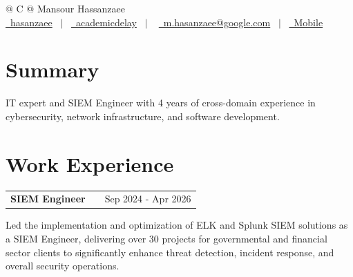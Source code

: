 \documentclass[a4paper,12pt]{article}
\makeatletter
\newenvironment{jobshort}[2]
    {
    \begin{tabularx}{\linewidth}{@{}l X r@{}}
    \textbf{#1} & \hfill &  #2 \\[3.75pt]
    \end{tabularx}
    }
    {
    }
\makeatother
\begin{document}
\pagestyle{empty} 



\begin{tabularx}{\linewidth}{@{} C @{}}
\Huge{Mansour Hassanzaee} \\[7.5pt]
\href{https://github.com/hasanzaee}{\raisebox{-0.05\height}\faGithub\ hasanzaee} \ $|$ \ 
\href{https://www.linkedin.com/in/academicdelay}{\raisebox{-0.05\height}\faLinkedin\ academicdelay} \ $|$ \ 
\href{mailto:m.hasanzaee@google.com}{\raisebox{-0.05\height}\faEnvelope \ m.hasanzaee@google.com} \ $|$ \ 
\href{tel:+989015882524}{\raisebox{-0.05\height}\faMobile \ Mobile} \\
\end{tabularx}


\section{Summary}
IT expert and SIEM Engineer with 4 years of cross-domain experience in cybersecurity, network infrastructure, and software development.

\section{Work Experience}

\begin{jobshort}{SIEM Engineer}{Sep 2024 - Apr 2026 }
Led the implementation and optimization of ELK and Splunk SIEM solutions as a SIEM Engineer, delivering over 30 projects for governmental and financial sector clients to significantly enhance threat detection, incident response, and overall security operations.
\end{jobshort}
\end{document}
